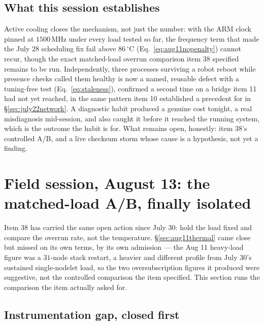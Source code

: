 \subsection*{What this session establishes}
Active cooling closes the mechanism, not just the number: with the ARM
clock pinned at $1500$\,MHz under every load tested so far, the frequency
term that made the July 28 scheduling fix fail above $86\,^\circ$C
(Eq.~\ref{eq:aug11nopenalty}) cannot recur, though the exact matched-load
overrun comparison item 38 specified remains to be run. Independently, three
processes surviving a robot reboot while presence checks called them healthy
is now a named, reusable defect with a tuning-free test (Eq.~\ref{eq:staleness}),
confirmed a second time on a bridge item 11 had not yet reached, in the same
pattern item 10 established a precedent for in \S\ref{sec:july22network}. A
diagnostic habit produced a genuine cost tonight, a real misdiagnosis
mid-session, and also caught it before it reached the running system, which
is the outcome the habit is for. What remains open, honestly: item 38's
controlled A/B, and a live checksum storm whose cause is a hypothesis, not
yet a finding.

\section{Field session, August 13: the matched-load A/B, finally isolated}
\label{sec:aug13ab}

Item 38 has carried the same open action since July 30: hold the load fixed
and compare the overrun rate, not the temperature. \S\ref{sec:aug11thermal}
came close but missed on its own terms, by its own admission --- the Aug 11
heavy-load figure was a $31$-node stack restart, a heavier and different
profile from July 30's sustained single-nodelet load, so the two
oversubscription figures it produced were suggestive, not the controlled
comparison the item specified. This section runs the comparison the item
actually asked for.

\subsection{Instrumentation gap, closed first}

